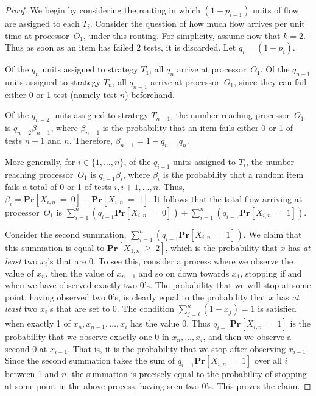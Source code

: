 \documentclass{article}
\newcounter{ass}
\newcommand{\ens}[1]{\ensuremath{#1}}					\newcommand{\card}[1]{\ens{|#1|}}							\newcommand{\dotlist}[2]{\ens{#1,\ldots,#2}}
\newcommand{\anitem}{\ens{x}}
\newcommand{\valn}{\ens{n}}
\newcommand{\valk}{\ens{k}}
\newcommand{\processor}{processor}
\newcommand{\retval}[1]{\ens{\anitem_{#1}}}					\newcommand{\pr}[1]{\ens{p_{#1}}}									\newcommand{\qr}[1]{\ens{q_{#1}}}									\newcommand{\op}[1]{\ens{O_{#1}}}									\newcommand{\megaop}[1]{\ens{E_{#1}}}
\newcommand{\probgen}[1]{\ens{\mathbf{Pr}\left[#1\right]}}
\newcommand{\hitsum}[2]{\ens{X_{#1,#2}}}					\newcommand{\probeq}[3]{\probgen{\hitsum{#1}{#2}~=~#3}}
\newcommand{\probge}[3]{\probgen{\hitsum{#1}{#2}~\geq~#3}}
\begin{document}
\begin{proof}
We begin by considering the routing in which $(1-\pr{i-1})$ units of flow
are assigned to each $T_i$.
Consider the question of how much flow arrives per unit time at \processor\ \op 1, under
this routing.
For simplicity, assume now that $\valk = 2$.
Thus as soon as an item has failed 2 tests, it is discarded.
Let  $\qr i = (1-\pr i)$.

Of the $\qr{\valn}$ units assigned to strategy $T_1$, all  $\qr{\valn}$ arrive at \processor\ \op 1.
Of the $\qr{n-1}$ units assigned to strategy $T_{n}$, all $\qr{n-1}$ arrive at \processor\ \op 1,
since they can fail either 0 or 1 test (namely test \valn) beforehand.

Of the $\qr{n-2}$ units assigned to strategy $T_{n-1}$, the number
reaching \processor\ \op 1 is $\qr{n-2}\beta_{n-1}$, where $\beta_{n-1}$ is the probability
that an item fails either 0 or 1 of tests $\valn-1$ and \valn.
Therefore, $\beta_{n-1} = 1- \qr{n-1}\qr{\valn}$.

More generally, for $i \in \{1, \ldots, n\}$, of the $\qr{i-1}$ units assigned to $T_i$,
the number reaching \processor\ \op 1 is $\qr{i-1}\beta_i$,
where $\beta_i$ is the probability that a random item fails a total of 0 or 1 of
tests $i, i+1, \ldots, n$.
Thus, $\beta_i = \probeq i\valn 0 +\probeq i\valn 1$.
It follows that the total flow arriving at \processor\ \op 1 is 
$\sum_{i=1}^{n} (\qr{i-1} \probeq i\valn 0)  + \sum_{i=1}^n (\qr{i-1}\probeq i\valn 1).$

Consider the second summation,
$\sum_{i=1}^n (\qr{i-1}\probeq i\valn 1)$.
We claim that this summation is equal to $\probge 1\valn 2$, which
is the probability that \anitem{} 
has {\em at least} two \retval{i}'s that are 0.
To see this,
consider a process where we observe the value of $\retval{\valn}$, 
then the value of $\retval{n-1}$ 
and so on down towards $\retval 1$, 
stopping if and when we have observed exactly two 0's.
The probability that we will stop at some point, having observed two 0's, is clearly
equal to the probability that \anitem{} has {\em at least} two \retval{i}'s that are set to 0.
The condition
$\sum_{j=i}^{n} (1 - \retval j) = 1$ is satisfied when
exactly 1 of $\retval{n}, \retval{n-1}, \ldots, \retval i$ has the value 0.
Thus $\qr{i-1}\probeq i\valn 1$
is the probability that we observe exactly one $0$ in 
$\retval{\valn}, \ldots, \retval i$, and then
we observe a second 0 at $\retval{i-1}$.  That is, it is the probability
that we stop after observing $\retval{i-1}$.
Since the second summation takes the sum of 
$\qr{i-1}\probeq i\valn 1$ over all $i$ between 1 and \valn,
the summation is precisely equal to 
the probability of stopping at some point in the above process, having
seen two 0's.  This proves the claim.


\end{proof}
\end{document}

